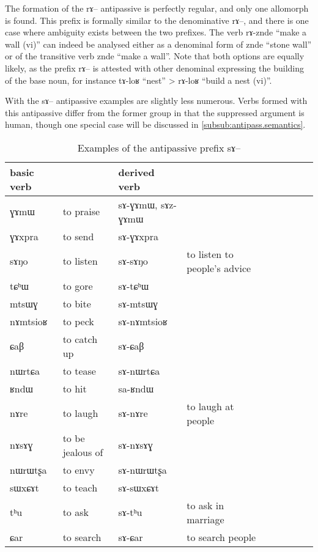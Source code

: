 \documentclass[oldfontcommands,oneside,a4paper,11pt]{memoir}
\newcommand{\ipa}[1]{{\phon #1}} %
\begin{document}
The formation of the \ipa{rɤ}-- antipassive is perfectly regular, and only one allomorph is found. This prefix is formally similar to the denominative \ipa{rɤ}--, and there is one case where ambiguity exists between the two prefixes. The verb \ipa{rɤ-znde} ``make a wall (vi)'' can indeed be analysed either as a denominal form of \ipa{znde} ``stone wall'' or of the transitive verb \ipa{znde}  ``make a wall''.  Note that both options are equally likely, as the prefix \ipa{rɤ}-- is attested with other denominal expressing the building of the base noun, for instance \ipa{tɤ-loʁ} ``nest'' > \ipa{rɤ-loʁ} ``build a nest (vi)''.


With the  \ipa{sɤ}-- antipassive examples are slightly less numerous. Verbs formed with this antipassive differ from the former group in that the suppressed argument is human, though one special case  will be discussed in \ref{subsub:antipass.semantics}.

\begin{table}[H]
\caption{Examples of the antipassive prefix \ipa{sɤ}--}\label{tab:antipassive2}
\begin{tabular}{lllllllll} \toprule
basic verb  & &derived  verb &\\
\midrule
\ipa{ɣɤmɯ}   &	to praise &  	\ipa{sɤ-ɣɤmɯ, sɤz-ɣɤmɯ}   &	 \\  
\ipa{ɣɤxpra}   &	to send &  	\ipa{sɤ-ɣɤxpra}   &	 \\  
\ipa{sɤŋo}   &	to listen &  	\ipa{sɤ-sɤŋo}   &to listen to people's advice	 \\  
\ipa{tɕʰɯ}   &	to gore &  	\ipa{sɤ-tɕʰɯ}   &	 \\  
\ipa{mtsɯɣ}   &	to bite &  	\ipa{sɤ-mtsɯɣ}   &	 \\  
\ipa{nɤmtsioʁ}   &	to peck &  	\ipa{sɤ-nɤmtsioʁ}   &	 \\  
\ipa{ɕaβ}   &	to catch up &  	\ipa{sɤ-ɕaβ}   &	 \\  
\ipa{nɯrtɕa}   &	to tease &  	\ipa{sɤ-nɯrtɕa}   &	 \\ 
\ipa{ʁndɯ}   &	to hit &  	\ipa{sa-ʁndɯ}   &	 \\  
\ipa{nɤre}   &	to laugh &  	\ipa{sɤ-nɤre}   &	to laugh at people \\  
\ipa{nɤsɤɣ}   &	to be jealous of &  	\ipa{sɤ-nɤsɤɣ}   &	 \\  
\ipa{nɯrɯtʂa}   &	to envy &  	\ipa{sɤ-nɯrɯtʂa}   &	 \\  
\ipa{sɯxɕɤt}   &	to teach &  	\ipa{sɤ-sɯxɕɤt}   &	 \\  
\ipa{tʰu}   &	to ask &  	\ipa{sɤ-tʰu}   &	to ask in marriage \\  
\ipa{ɕar}   &	to search &  	\ipa{sɤ-ɕar}   &	to search people \\ 
\bottomrule
\end{tabular}
\end{table}
\end{document}
